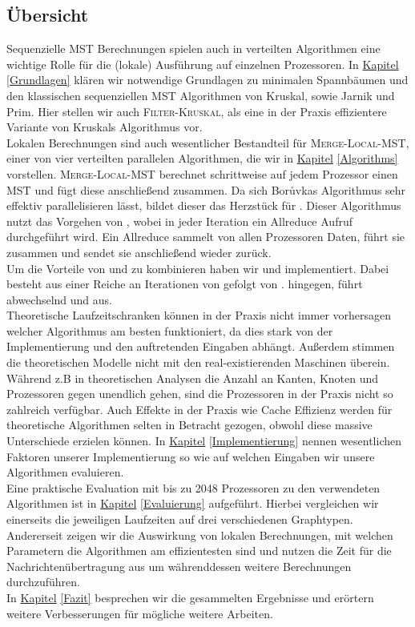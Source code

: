 \subsection{Übersicht}
Sequenzielle MST Berechnungen spielen auch in verteilten Algorithmen eine wichtige Rolle für die (lokale) Ausführung auf einzelnen Prozessoren. In \hyperref[Grundlagen]{Kapitel} \ref{Grundlagen} klären wir 
notwendige Grundlagen zu minimalen Spannbäumen und den klassischen sequenziellen MST Algorithmen von Kruskal, \boruvka sowie Jarnik und Prim. Hier stellen wir auch \textsc{Filter-Kruskal}, als eine in der Praxis effizientere Variante von Kruskals Algorithmus vor.\\
Lokalen Berechnungen sind auch wesentlicher Bestandteil für \textsc{Merge-Local-MST}, einer von vier verteilten parallelen Algorithmen, die wir in \hyperref[Algorithms]{Kapitel} \ref{Algorithms} vorstellen. \textsc{Merge-Local-MST} berechnet schrittweise auf jedem Prozessor einen MST und fügt diese anschließend zusammen. 
Da sich Bor{\r u}vkas Algorithmus sehr effektiv parallelisieren lässt, bildet dieser das Herzstück für \boruvkaAllreduce.
Dieser Algorithmus nutzt das Vorgehen von \boruvka, wobei in jeder Iteration ein Allreduce Aufruf durchgeführt wird. Ein Allreduce sammelt von allen Prozessoren Daten, führt sie zusammen und sendet sie anschließend wieder zurück.\\
Um die Vorteile von \boruvkaAllreduce und \mergeMST zu kombinieren haben wir \boruvkaThenMerge und \boruvkaMixedMerge implementiert. Dabei besteht \boruvkaThenMerge aus einer Reiche an Iterationen von \boruvkaAllreduce gefolgt von \mergeMST. \boruvkaThenMerge hingegen, führt abwechselnd \boruvkaAllreduce und \mergeMST aus.\\
Theoretische Laufzeitschranken können in der Praxis nicht immer vorhersagen welcher Algorithmus am besten funktioniert, da dies stark von der Implementierung und den  auftretenden Eingaben abhängt.
Außerdem stimmen die theoretischen Modelle nicht mit den real-existierenden Maschinen überein. Während z.B in theoretischen Analysen die Anzahl an Kanten, Knoten und Prozessoren gegen unendlich gehen, sind die Prozessoren in der Praxis nicht so zahlreich verfügbar. Auch Effekte in der Praxis wie Cache Effizienz werden für theoretische Algorithmen selten in Betracht gezogen, obwohl diese massive Unterschiede erzielen können.
In \hyperref[Implementierung]{Kapitel} \ref{Implementierung} nennen wesentlichen Faktoren unserer Implementierung so wie auf welchen Eingaben wir unsere Algorithmen evaluieren.\\
Eine praktische Evaluation mit bis zu 2048 Prozessoren zu den verwendeten Algorithmen ist in \hyperref[Evaluierung]{Kapitel} \ref{Evaluierung} aufgeführt.
Hierbei vergleichen wir einerseits die jeweiligen Laufzeiten auf drei verschiedenen Graphtypen. Andererseit zeigen wir die Auswirkung von lokalen Berechnungen, mit welchen Parametern die Algorithmen am effizientesten sind und nutzen die Zeit für die Nachrichtenübertragung aus um währenddessen weitere Berechnungen durchzuführen. \\
In \hyperref[Fazit]{Kapitel} \ref{Fazit} besprechen wir die gesammelten Ergebnisse und erörtern weitere Verbesserungen für mögliche weitere Arbeiten.




